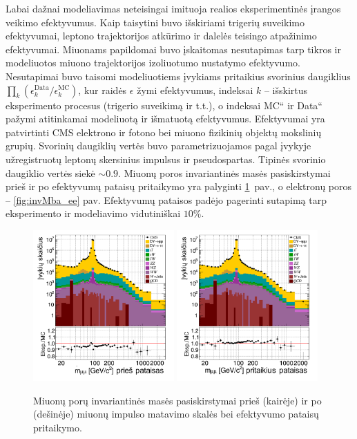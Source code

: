 \documentclass[a4paper, 12pt, oneside]{article}
\newcommand{\ltq}[1]{{\quotedblbase{}#1\textquotedblleft{}}}
\newlength\q
\begin{document}
Labai dažnai modeliavimas neteisingai imituoja realios eksperimentinės įrangos veikimo efektyvumus.
Kaip taisytini buvo išskiriami trigerių suveikimo efektyvumai, leptono trajektorijos atkūrimo ir dalelės teisingo
atpažinimo efektyvumai.
Miuonams papildomai buvo įskaitomas nesutapimas tarp tikros ir modeliuotos miuono trajektorijos izoliuotumo nustatymo efektyvumo.
Nesutapimai buvo taisomi modeliuotiems įvykiams pritaikius svorinius daugiklius $\prod_k(\epsilon_k^{\mathrm{Data}}/\epsilon_k^{\mathrm{MC}})$, 
kur raidės $\epsilon$ žymi efektyvumus, indeksai $k$ -- išskirtus eksperimento procesus (trigerio suveikimą ir t.t.),
o indeksai \ltq{MC} ir \ltq{Data} pažymi atitinkamai modeliuotą ir išmatuotą efektyvumus.
Efektyvumai yra patvirtinti CMS elektrono ir fotono bei miuono fizikinių objektų mokslinių grupių.
Svorinių daugiklių vertės buvo parametrizuojamos pagal įvykyje užregistruotų leptonų skersinius impulsus ir pseudospartas.
Tipinės svorinio daugiklio vertės siekė $\sim\!0.9$.
Miuonų poros invariantinės masės pasiskirstymai prieš ir po efektyvumų pataisų pritaikymo yra palyginti \ref{fig:invMba_mumu}~pav.,
o elektronų poros -- \ref{fig:invMba_ee} pav.
Efektyvumų pataisos padėjo pagerinti sutapimą tarp eksperimento ir modeliavimo vidutiniškai $10\%$.
\begin{figure}[b!]
	\RawFloats
	\includegraphics[width=0.48\textwidth]{Magistrinis/mumu_mass_before.png}
	\includegraphics[width=0.48\textwidth]{Magistrinis/mumu_mass_after.png}
	\vspace{-0.3cm}
	\caption{\label{fig:invMba_mumu} Miuonų porų invariantinės masės pasiskirstymai prieš (kairėje) ir po (dešinėje)
	miuonų impulso matavimo skalės bei efektyvumo pataisų pritaikymo.}
\end{figure}
\end{document}
